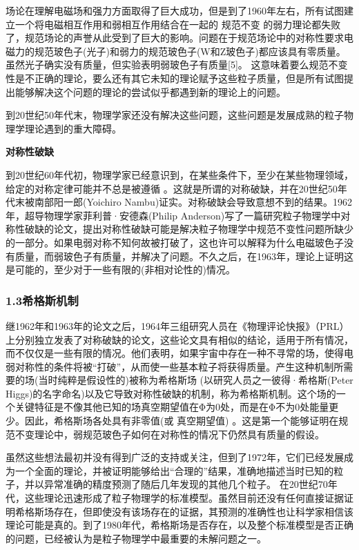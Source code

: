 场论在理解电磁场和强力方面取得了巨大成功，但是到了1960年左右，所有试图建立一个将电磁相互作用和弱相互作用结合在一起的 规范不变 的弱力理论都失败了，规范场论的声誉从此受到了巨大的影响。问题在于规范场论中的对称性要求电磁力的规范玻色子(光子)和弱力的规范玻色子(W和Z玻色子)都应该具有零质量。虽然光子确实没有质量，但实验表明弱玻色子有质量[5]。 这意味着要么规范不变性是不正确的理论，要么还有其它未知的理论赋予这些粒子质量，但是所有试图提出能够解决这个问题的理论的尝试似乎都遇到新的理论上的问题。

到20世纪50年代末，物理学家还没有解决这些问题，这些问题是发展成熟的粒子物理学理论遇到的重大障碍。

\textbf{对称性破缺}

到20世纪60年代初，物理学家已经意识到，在某些条件下，至少在某些物理领域，给定的对称定律可能并不总是被遵循 。这就是所谓的对称破缺，并在20世纪50年代末被南部阳一郎(Yoichiro Nambu)证实。对称破缺会导致意想不到的结果。1962年，超导物理学家菲利普·安德森(Philip Anderson)写了一篇研究粒子物理学中对称性破缺的论文，提出对称性破缺可能是解决粒子物理学中规范不变性问题所缺少的一部分。如果电弱对称不知何故被打破了，这也许可以解释为什么电磁玻色子没有质量，而弱玻色子有质量，并解决了问题。不久之后，在1963年，理论上证明这是可能的，至少对于一些有限的(非相对论性的)情况。

\subsubsection{1.3希格斯机制}

继1962年和1963年的论文之后，1964年三组研究人员在《物理评论快报》（PRL）上分别独立发表了对称破缺的论文，这些论文具有相似的结论，适用于所有情况，而不仅仅是一些有限的情况。他们表明，如果宇宙中存在一种不寻常的场，使得电弱对称性的条件将被“打破”，从而使一些基本粒子将获得质量。产生这种机制所需要的场(当时纯粹是假设性的)被称为希格斯场 (以研究人员之一彼得·希格斯(Peter Higgs)的名字命名)以及它导致对称性破缺的机制，称为希格斯机制。这个场的一个关键特征是不像其他已知的场真空期望值在Φ为0处，而是在Φ不为0处能量更少。因此，希格斯场各处具有非零值(或 真空期望值) 。这是第一个能够证明在规范不变理论中，弱规范玻色子如何在对称性的情况下仍然具有质量的假设。

虽然这些想法最初并没有得到广泛的支持或关注，但到了1972年，它们已经发展成为一个全面的理论，并被证明能够给出“合理的”结果，准确地描述当时已知的粒子，并以异常准确的精度预测了随后几年发现的其他几个粒子。 在20世纪70年代，这些理论迅速形成了粒子物理学的标准模型。虽然目前还没有任何直接证据证明希格斯场存在，但即使没有该场存在的证据，其预测的准确性也让科学家相信该理论可能是真的。到了1980年代，希格斯场是否存在，以及整个标准模型是否正确的问题，已经被认为是粒子物理学中最重要的未解问题之一。

